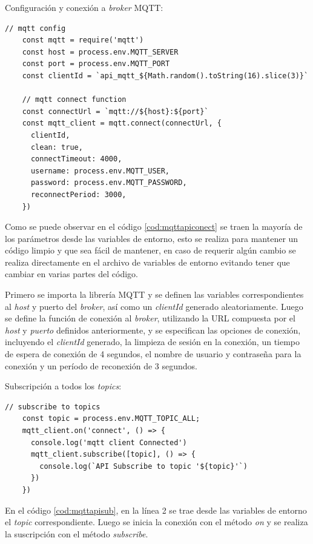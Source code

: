 Configuración y conexión a \textit{broker} MQTT:
\begin{lstlisting}[label=cod:mqttapiconect,caption= Configuración y conexión a \textit{broker} MQTT en API REST.]
 // mqtt config
    const mqtt = require('mqtt')
    const host = process.env.MQTT_SERVER
    const port = process.env.MQTT_PORT
    const clientId = `api_mqtt_${Math.random().toString(16).slice(3)}`
    
    // mqtt connect function
    const connectUrl = `mqtt://${host}:${port}`
    const mqtt_client = mqtt.connect(connectUrl, {
      clientId,
      clean: true,
      connectTimeout: 4000,
      username: process.env.MQTT_USER,
      password: process.env.MQTT_PASSWORD,
      reconnectPeriod: 3000,
    })
\end{lstlisting}

Como se puede observar en el código \ref{cod:mqttapiconect} se traen la mayoría de los parámetros desde las variables de entorno, esto se realiza para mantener un código limpio y que sea fácil de mantener, en caso de requerir algún cambio se realiza directamente en el archivo de variables de entorno evitando tener que cambiar en varias partes del código.

Primero se importa la librería MQTT y se definen las variables correspondientes al \textit{host} y puerto del \textit{broker}, así como un \textit{clientId} generado aleatoriamente. Luego se define la función de conexión al \textit{broker}, utilizando la URL compuesta por el \textit{host} y \textit{puerto} definidos anteriormente, y se especifican las opciones de conexión, incluyendo el \textit{clientId} generado, la limpieza de sesión en la conexión, un tiempo de espera de conexión de 4 segundos, el nombre de usuario y contraseña para la conexión y un período de reconexión de 3 segundos.


Subscripción a todos los \textit{topics}:

\begin{lstlisting}[label=cod:mqttapisub,caption=Subscripción a \textit{topics} en API REST.]
// subscribe to topics
    const topic = process.env.MQTT_TOPIC_ALL;
    mqtt_client.on('connect', () => {
      console.log('mqtt client Connected')
      mqtt_client.subscribe([topic], () => {
        console.log(`API Subscribe to topic '${topic}'`)
      })
    })
\end{lstlisting}

En el código \ref{cod:mqttapisub}, en la línea 2 se trae desde las variables de entorno el \textit{topic} correspondiente. Luego se inicia la conexión con el método \textit{on} y se realiza la suscripción con el método \textit{subscribe}. 

